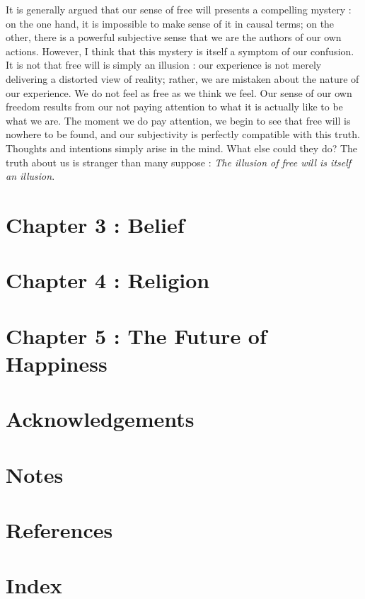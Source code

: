 \documentclass[a4paper,14pt]{extbook}
\begin{document}
It is generally argued that our sense of free will presents a compelling mystery :
on the one hand, it is impossible to make sense of it in causal terms;
on the other, there is a powerful subjective sense that we are the authors of our own actions.
However, I think that this mystery is itself a symptom of our confusion.
It is not that free will is simply an illusion :
our experience is not merely delivering a distorted view of reality;
rather, we are mistaken about the nature of our experience.
We do not feel as free as we think we feel.
Our sense of our own freedom results from our not paying attention to what it is actually like to be what we are.
The moment we do pay attention, we begin to see that free will is nowhere to be found, and our subjectivity is perfectly compatible with this truth.
Thoughts and intentions simply arise in the mind.
What else could they do?
The truth about us is stranger than many suppose :
\textit{The illusion of free will is itself an illusion}.

\newpage
\section{Chapter 3 : Belief}

\newpage
\section{Chapter 4 : Religion}

\newpage
\section{Chapter 5 : The Future of Happiness}

\newpage
\section{Acknowledgements}

\newpage
\section{Notes}

\newpage
\section{References}

\newpage
\section{Index}
\end{document}

